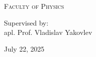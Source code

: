 \begin{titlepage}
    \vfill
    \vspace{0.7cm}
    \textsc{Faculty of Physics}
    
    \vspace{0.6cm}
    \vspace{0.3cm}


    Supervised by: \\apl. Prof. Vladislav Yakovlev %

    \vfill
    \vspace{0.9cm}
    
    {\Large July 22, 2025}
    
\end{titlepage}